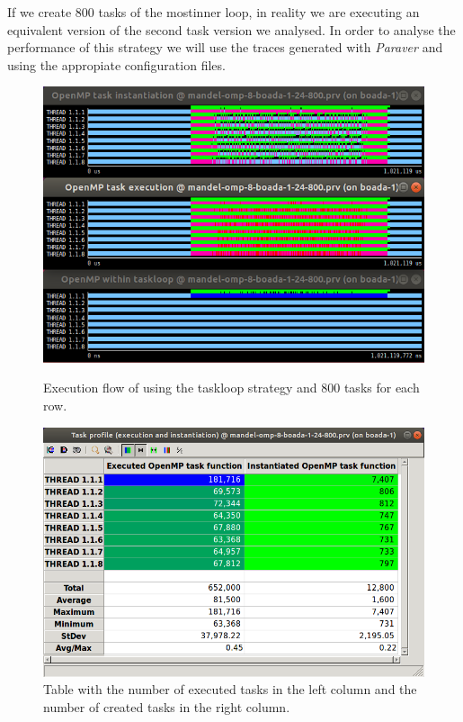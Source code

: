 \documentclass[12pt, a4paper]{article}
\begin{document}
If we create 800 tasks of the mostinner loop, in reality we are executing an equivalent version of the second task version we analysed. In order to analyse the performance of this strategy we will use the traces generated with \textit{Paraver} and using the appropiate configuration files.

\begin{figure}[H]
\begin{minipage}[t]{0.48\linewidth}
  \centering
  \includegraphics[scale=0.35]{./S2_OMP_tasks_24_800}
  \caption{Execution flow of using the taskloop strategy and 800 tasks for each row.}
  \label{fig:S2_OMP_tasks_24_800}
\end{minipage}%
\hspace{0.5cm}
\begin{minipage}[t]{0.48\linewidth}
  \centering
  \includegraphics[scale=0.3]{./S2_OMP_tasks_24_800_table}
  \caption{Table with the number of executed tasks in the left column and the number of created tasks in the right column.}
  \label{fig:S2_OMP_tasks_24_800_table}
\end{minipage}
\end{figure}
\end{document}
